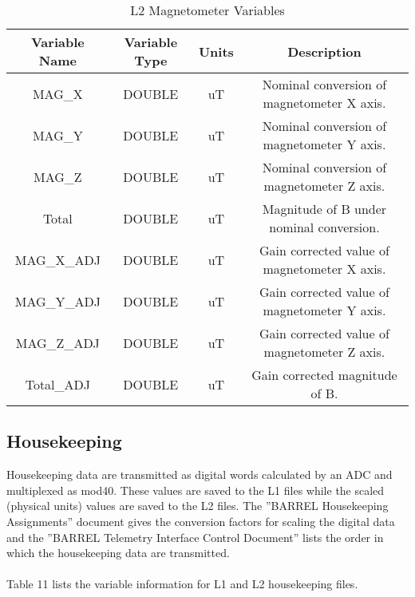 \documentclass{article}
\begin{document}
\begin{table}[H]
\caption{L2 Magnetometer Variables}
\begin{tabular}{|c|c|c|c|}
\hline
Variable Name&Variable Type&Units&Description\\ \hline
MAG\_X&DOUBLE&uT&Nominal conversion of magnetometer X axis.\\ 
MAG\_Y&DOUBLE&uT&Nominal conversion of magnetometer Y axis.\\ 
MAG\_Z&DOUBLE&uT&Nominal conversion of magnetometer Z axis.\\ 
Total&DOUBLE&uT&Magnitude of B under nominal conversion.\\ 
MAG\_X\_ADJ&DOUBLE&uT&Gain corrected value of magnetometer X axis.\\ 
MAG\_Y\_ADJ&DOUBLE&uT&Gain corrected value of magnetometer Y axis.\\ 
MAG\_Z\_ADJ&DOUBLE&uT&Gain corrected value of magnetometer Z axis.\\ 
Total\_ADJ&DOUBLE&uT&Gain corrected magnitude of B.\\ 
\hline
\end{tabular}
\end{table}

\subsection{Housekeeping}
Housekeeping data are transmitted as digital words calculated by an ADC and multiplexed as mod40. These values are saved to the L1 files while the scaled (physical units) values are saved to the L2 files. The ''BARREL Housekeeping Assignments'' document gives the conversion factors for scaling the digital data and the ''BARREL Telemetry Interface Control Document'' lists the order in which the housekeeping data are transmitted.\\\\
Table 11 lists the variable information for L1 and L2 housekeeping files.\\\\
\end{document}
